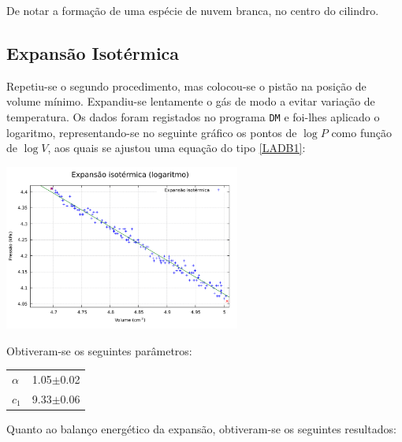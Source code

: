 \documentclass[9pt]{extarticle}
\begin{document}
\begin{multicols}{2}
\par De notar a formação de uma espécie de nuvem branca, no centro do cilindro.

\subsection*{Expansão Isotérmica}

\par Repetiu-se o segundo procedimento, mas colocou-se o pistão na posição de volume mínimo. Expandiu-se lentamente o gás de modo a evitar variação de temperatura. Os dados foram registados no programa \verb|DM| e foi-lhes aplicado o logaritmo, representando-se no seguinte gráfico os pontos de $\log{P}$ como função de $\log{V}$, aos quais se ajustou uma equação do tipo \eqref{LADB1}:

\includegraphics[width=220pt]{lexp_iso.pdf}
\begin{center}
\par{}
\end{center}

\par Obtiveram-se os seguintes parâmetros:

\begin{center}
\begin{tabular}{ x{1cm} x{2.5cm} }
\hline \hline
$\alpha$ & 1.05$\pm$0.02 \tabularnewline
$c_1$ & 9.33$\pm$0.06 \tabularnewline
\hline \hline
\end{tabular}
\end{center}

\par Quanto ao balanço energético da expansão, obtiveram-se os seguintes resultados:


\end{multicols}
\end{document}
